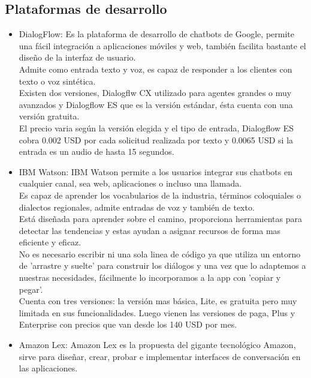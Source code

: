 \subsection{Plataformas de desarrollo}
\begin{itemize}
	\item DialogFlow:
	      Es la plataforma de desarrollo de chatbots de Google, permite una fácil integración a
	      aplicaciones móviles y web, también facilita bastante el diseño de la interfaz de usuario.\\
	      Admite como entrada texto y voz, es capaz de responder a los clientes con texto o voz
	      sintética.\\
	      Existen dos versiones, Dialogflw CX utilizado para agentes grandes o muy avanzados y
	      Dialogflow ES que es la versión estándar, ésta cuenta con una versión gratuita.\\
	      El precio varia según la versión elegida y el tipo de entrada, Dialogflow ES cobra 0.002
	      USD por cada solicitud realizada por texto y 0.0065 USD si la entrada es un audio de hasta 15
	      segundos.\cite{Dialogflow}
	\item IBM Watson:
	      IBM Watson  permite a los usuarios integrar sus chatbots en cualquier canal, sea web,
	      aplicaciones o incluso una llamada.\\
	      Es capaz de aprender los vocabularios de la industria,	términos coloquiales o dialectos
	      regionales, admite entradas de voz y también de texto. \\
	      Está diseñada para aprender sobre el camino, proporciona herramientas para detectar las
	      tendencias y estas ayudan a asignar recursos de forma mas eficiente y eficaz.\\
	      No es necesario escribir ni una sola linea de código ya que utiliza un entorno de 'arrastre
	      y suelte' para construir los diálogos y una vez que lo adaptemos a nuestras necesidades, fácilmente
	      lo incorporamos a la app con 'copiar y pegar'.\cite{IBMCloud2020}\\
	      Cuenta con tres versiones: la versión mas básica, Lite, es gratuita pero muy limitada en
	      sus funcionalidades.
	      Luego vienen las versiones de paga, Plus y Enterprise con precios que van desde los 140 USD
	      por mes.\cite{IBM_Price}
	\item Amazon Lex:
	      Amazon Lex es la propuesta del gigante tecnológico Amazon, sirve para diseñar, crear,
	      probar e implementar interfaces de conversación en las aplicaciones.\\

\end{itemize}

